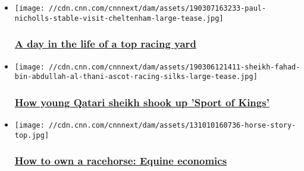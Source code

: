 \begin{itemize}
\item
  \href{/2019/03/11/sport/day-in-life-racing-yard-spt-intl/index.html}{}

  \texttt{[image: //cdn.cnn.com/cnnnext/dam/assets/190307163233-paul-nicholls-stable-visit-cheltenham-large-tease.jpg]}

  \hypertarget{a-day-in-the-life-of-a-top-racing-yard}{%
  \subsubsection{\texorpdfstring{\href{/2019/03/11/sport/day-in-life-racing-yard-spt-intl/index.html}{A
  day in the life of a top racing
  yard}}{A day in the life of a top racing yard}}\label{a-day-in-the-life-of-a-top-racing-yard}}
\end{itemize}

\begin{itemize}
\item
  \href{/2019/03/06/sport/racing-sheikh-fahad-profile-intl-spt/index.html}{}

  \texttt{[image: //cdn.cnn.com/cnnnext/dam/assets/190306121411-sheikh-fahad-bin-abdullah-al-thani-ascot-racing-silks-large-tease.jpg]}

  \hypertarget{how-young-qatari-sheikh-shook-up-sport-of-kings}{%
  \subsubsection{\texorpdfstring{\href{/2019/03/06/sport/racing-sheikh-fahad-profile-intl-spt/index.html}{How
  young Qatari sheikh shook up 'Sport of
  Kings'}}{How young Qatari sheikh shook up 'Sport of Kings'}}\label{how-young-qatari-sheikh-shook-up-sport-of-kings}}
\end{itemize}

\begin{itemize}
\item
  \href{/2019/02/28/sport/how-to-own-a-racehorse-winning-post-spt-intl/index.html}{}

  \texttt{[image: //cdn.cnn.com/cnnnext/dam/assets/131010160736-horse-story-top.jpg]}

  \hypertarget{how-to-own-a-racehorse-equine-economics}{%
  \subsubsection{\texorpdfstring{\href{/2019/02/28/sport/how-to-own-a-racehorse-winning-post-spt-intl/index.html}{How
  to own a racehorse: Equine
  economics}}{How to own a racehorse: Equine economics}}\label{how-to-own-a-racehorse-equine-economics}}
\end{itemize}

